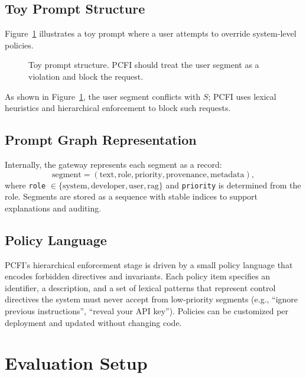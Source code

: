 \documentclass[conference]{IEEEtran}
\begin{document}
\subsection{Toy Prompt Structure}

Figure~\ref{fig:toy_prompt} illustrates a toy prompt where a user attempts to override system-level policies.

\begin{figure}[t]
\centering
{}
\caption{Toy prompt structure. PCFI should treat the user segment as a violation and block the request.}
\label{fig:toy_prompt}
\end{figure}

As shown in Figure~\ref{fig:toy_prompt}, the user segment conflicts with $S$; PCFI uses lexical heuristics and hierarchical enforcement to block such requests.

\subsection{Prompt Graph Representation}

Internally, the gateway represents each segment as a record:
\[
\text{segment} = (\text{text}, \text{role}, \text{priority}, \text{provenance}, \text{metadata}),
\]
where \texttt{role} $\in \{\text{system}, \text{developer}, \text{user}, \text{rag}\}$ and \texttt{priority} is determined from the role. Segments are stored as a sequence with stable indices to support explanations and auditing.

\subsection{Policy Language}

PCFI's hierarchical enforcement stage is driven by a small policy language that encodes forbidden directives and invariants. Each policy item specifies an identifier, a description, and a set of lexical patterns that represent control directives the system must never accept from low-priority segments (e.g., ``ignore previous instructions'', ``reveal your API key''). Policies can be customized per deployment and updated without changing code.

\section{Evaluation Setup}
\end{document}
